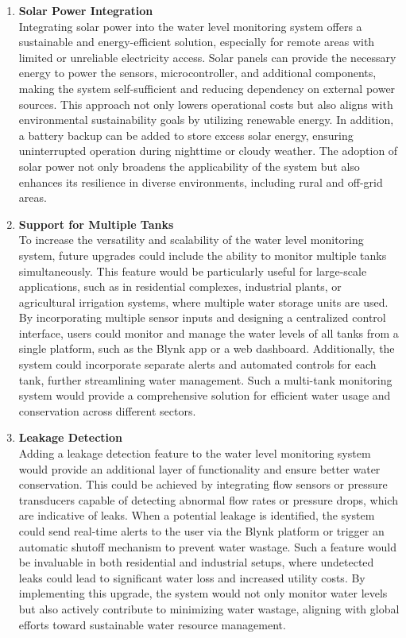 {\begin{enumerate}
    \item \textbf{Solar Power Integration} \\
    Integrating solar power into the water level monitoring system offers a sustainable and energy-efficient solution, especially for remote areas with limited or unreliable electricity access. Solar panels can provide the necessary energy to power the sensors, microcontroller, and additional components, making the system self-sufficient and reducing dependency on external power sources. This approach not only lowers operational costs but also aligns with environmental sustainability goals by utilizing renewable energy. In addition, a battery backup can be added to store excess solar energy, ensuring uninterrupted operation during nighttime or cloudy weather. The adoption of solar power not only broadens the applicability of the system but also enhances its resilience in diverse environments, including rural and off-grid areas.

    \item \textbf{Support for Multiple Tanks} \\
    To increase the versatility and scalability of the water level monitoring system, future upgrades could include the ability to monitor multiple tanks simultaneously. This feature would be particularly useful for large-scale applications, such as in residential complexes, industrial plants, or agricultural irrigation systems, where multiple water storage units are used. By incorporating multiple sensor inputs and designing a centralized control interface, users could monitor and manage the water levels of all tanks from a single platform, such as the Blynk app or a web dashboard. Additionally, the system could incorporate separate alerts and automated controls for each tank, further streamlining water management. Such a multi-tank monitoring system would provide a comprehensive solution for efficient water usage and conservation across different sectors.

    \item \textbf{Leakage Detection} \\
    Adding a leakage detection feature to the water level monitoring system would provide an additional layer of functionality and ensure better water conservation. This could be achieved by integrating flow sensors or pressure transducers capable of detecting abnormal flow rates or pressure drops, which are indicative of leaks. When a potential leakage is identified, the system could send real-time alerts to the user via the Blynk platform or trigger an automatic shutoff mechanism to prevent water wastage. Such a feature would be invaluable in both residential and industrial setups, where undetected leaks could lead to significant water loss and increased utility costs. By implementing this upgrade, the system would not only monitor water levels but also actively contribute to minimizing water wastage, aligning with global efforts toward sustainable water resource management.
\end{enumerate}
}